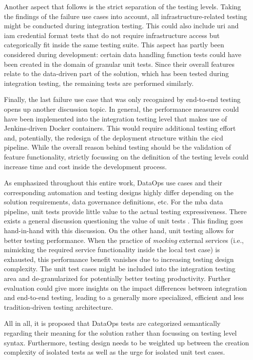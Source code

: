 Another aspect that follows is the strict separation of the testing levels. Taking the findings of the failure use cases into account, all infrastructure-related testing might be conducted during integration testing. This could also include \acs{uri} and \acs{iam} credential format tests that do not require infrastructure access but categorically fit inside the same testing suite. This aspect has partly been considered during development: certain data handling function tests could have been created in the domain of granular unit tests. Since their overall features relate to the data-driven part of the solution, which has been tested during integration testing, the remaining tests are performed similarly.

Finally, the last failure use case that was only recognized by end-to-end testing opens up another discussion topic. In general, the performance measures could have been implemented into the integration testing level that makes use of Jenkins-driven Docker containers. This would require additional testing effort and, potentially, the redesign of the deployment structure within the \ac{cicd} pipeline. While the overall reason behind testing should be the validation of feature functionality, strictly focussing on the definition of the testing levels could increase time and cost inside the development process.

As emphasized throughout this entire work, DataOps use cases and their corresponding automation and testing designs highly differ depending on the solution requirements, data governance definitions, etc. For the \ac{mba} data pipeline, unit tests provide little value to the actual testing expressiveness. There exists a general discussion questioning the value of unit tests \cite{Coplien}\cite{Golub2020}. This finding goes hand-in-hand with this discussion. On the other hand, unit testing allows for better testing performance. When the practice of \textit{mocking} external services (i.e., mimicking the required service functionality inside the local test case) is exhausted, this performance benefit vanishes due to increasing testing design complexity. The unit test cases might be included into the integration testing area and de-granularized for potentially better testing productivity. Further evaluation could give more insights on the impact differences between integration and end-to-end testing, leading to a generally more specialized, efficient and less tradition-driven testing architecture. 

All in all, it is proposed that DataOps tests are categorized semantically regarding their meaning for the solution rather than focussing on testing level syntax. Furthermore, testing design needs to be weighted up between the creation complexity of isolated tests as well as the urge for isolated unit test cases. \\\

